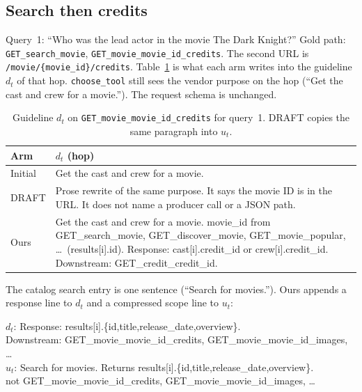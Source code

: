 \documentclass[11pt,a4paper]{article}
\begin{document}
\subsection{Search then credits}
\label{app:ex-credits}

Query~1: ``Who was the lead actor in the movie The Dark Knight?'' Gold path: \texttt{GET\_search\_movie}, \texttt{GET\_movie\_movie\_id\_credits}. The second URL is \texttt{/movie/\{movie\_id\}/credits}. Table~\ref{tab:ex-credits} is what each arm writes into the guideline $d_t$ of that hop. \texttt{choose\_tool} still sees the vendor purpose on the hop (``Get the cast and crew for a movie.''). The request schema is unchanged.

\begin{table}[H]
\centering
\caption{Guideline $d_t$ on \texttt{GET\_movie\_movie\_id\_credits} for query~1. DRAFT copies the same paragraph into $u_t$.}
\label{tab:ex-credits}
\small
\begin{tabular}{@{}l>{\raggedright\arraybackslash}p{}@{}}
\toprule
Arm & $d_t$ (hop) \\
\midrule
Initial & Get the cast and crew for a movie. \\
DRAFT & Prose rewrite of the same purpose. It says the movie ID is in the URL. It does not name a producer call or a JSON path. \\
Ours & Get the cast and crew for a movie. movie\_id from GET\_search\_movie, GET\_discover\_movie, GET\_movie\_popular, \ldots\ (results[i].id). Response: cast[i].credit\_id or crew[i].credit\_id. Downstream: GET\_credit\_credit\_id. \\
\bottomrule
\end{tabular}
\end{table}

The catalog search entry is one sentence (``Search for movies.''). Ours appends a response line to $d_t$ and a compressed scope line to $u_t$:

\begin{shaded}
\ttfamily\footnotesize
$d_t$: Response: results[i].\{id,title,release\_date,overview\}.\\
Downstream: GET\_movie\_movie\_id\_credits, GET\_movie\_movie\_id\_images, \ldots\\[0.3em]
$u_t$: Search for movies. Returns results[i].\{id,title,release\_date,overview\}.\\
not GET\_movie\_movie\_id\_credits, GET\_movie\_movie\_id\_images, \ldots
\end{shaded}
\end{document}
